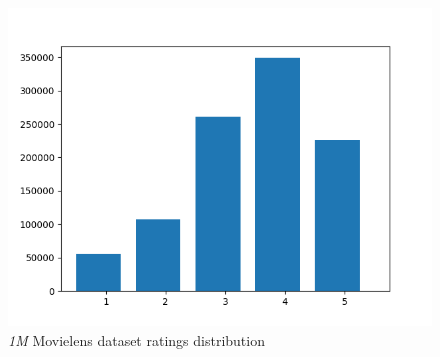 \begin{figure}[H]
\centering
\includegraphics[scale=0.6]{1m}
\caption{\emph{1M} Movielens dataset ratings distribution}
\end{figure}

